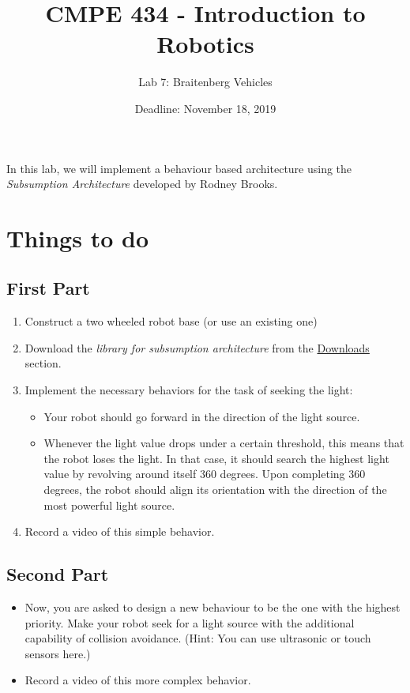 \documentclass{scrartcl}
\title{CMPE 434 - Introduction to Robotics}
\subtitle{Lab 7: Braitenberg Vehicles}
\date{Deadline: November 18, 2019}
\begin{document}
\maketitle

In this lab, we will implement a behaviour based architecture using the \emph{Subsumption Architecture} developed by Rodney Brooks.

\section{Things to do}

\subsection{First Part}
\begin{enumerate}
    \def\labelenumi{\arabic{enumi}.}
    \item Construct a two wheeled robot base (or use an existing one)
    \item Download the \textit{library for subsumption architecture} from the \href{http://robot.cmpe.boun.edu.tr/~cmpe434/doku.php?id=downloads#control}{Downloads} section.
    \item Implement the necessary behaviors for the task of seeking the light:
    
    \begin{itemize} 
        \item Your robot should go forward in the direction of the light source.
	    \item Whenever the light value drops under a certain threshold, this means that the robot loses the light. In that case, it should search the highest light value by revolving around itself 360 degrees. Upon completing 360 degrees, the robot should align its orientation with the direction of the most powerful light source.
    \end{itemize}
    \item  Record a video of this simple behavior.
\end{enumerate}

\subsection{Second Part}
\begin{itemize}
    \item Now, you are asked to design a new behaviour to be the one with the highest priority. Make your robot seek for a light source with the additional capability of collision avoidance. (Hint: You can use ultrasonic or touch sensors here.)
    \item  Record a video of this more complex behavior.
\end{itemize}
\end{document}
